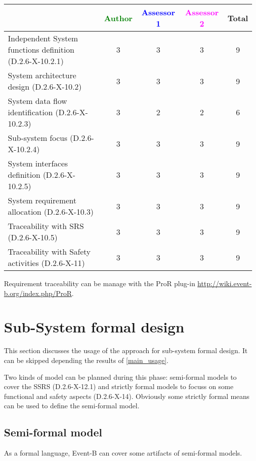 \begin{tabular}{|l | c | c | c | c|}
\hline
& \textcolor{green}{Author} & \textcolor{blue}{Assessor 1} & \textcolor{magenta}{Assessor 2} & Total \\
\hline
Independent System functions definition (D.2.6-X-10.2.1)  & 3 & 3 & 3 & 9 \\
\hline 
System architecture design (D.2.6-X-10.2) & 3 & 3 & 3 & 9 \\
\hline
System data flow identification (D.2.6-X-10.2.3)  & 3 & 2 & 2 &  6 \\
\hline
Sub-system focus (D.2.6-X-10.2.4)  & 3 & 3 & 3 & 9 \\
\hline
System interfaces definition (D.2.6-X-10.2.5)  & 3 & 3 & 3 & 9  \\
\hline
System requirement allocation (D.2.6-X-10.3)  & 3 & 3 & 3 & 9 \\
\hline
Traceability with SRS (D.2.6-X-10.5)  & 3 & 3 & 3 & 9 \\
\hline
Traceability with Safety activities (D.2.6-X-11)  & 3 & 3 & 3 & 9 \\
\hline
\end{tabular}

\begin{author_comment}
Requirement traceability can be manage with the ProR plug-in \url{http://wiki.event-b.org/index.php/ProR}.
\end{author_comment}

\section{Sub-System formal design}
This section discusses the usage of the approach for sub-system formal design.
It can be skipped depending the results of \ref{main_usage}.

Two kinds of model can be planned during this phase: semi-formal models to  cover the SSRS (D.2.6-X-12.1) and strictly formal  models to  focuss on some functional and safety aspects (D.2.6-X-14).  Obviously some strictly  formal means can be used to define the semi-formal  model.

\subsection{Semi-formal model}


\begin{author_comment}
As a formal language, Event-B  can cover some artifacts of semi-formal models.
\end{author_comment}

